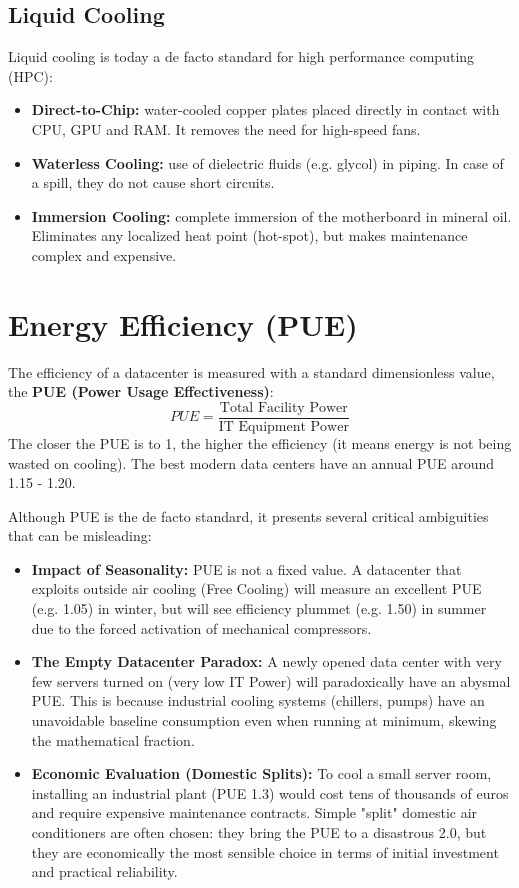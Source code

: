 \subsection{Liquid Cooling}
Liquid cooling is today a de facto standard for high performance computing (HPC):
\begin{itemize}
    \item \textbf{Direct-to-Chip:} water-cooled copper plates placed directly in contact with CPU, GPU and RAM. It removes the need for high-speed fans.
    \item \textbf{Waterless Cooling:} use of dielectric fluids (e.g. glycol) in piping. In case of a spill, they do not cause short circuits.
    \item \textbf{Immersion Cooling:} complete immersion of the motherboard in mineral oil. Eliminates any localized heat point (hot-spot), but makes maintenance complex and expensive.
\end{itemize}

\section{Energy Efficiency (PUE)}
The efficiency of a datacenter is measured with a standard dimensionless value, the \textbf{PUE (Power Usage Effectiveness)}:
\[
PUE = \frac{\text{Total Facility Power}}{\text{IT Equipment Power}}
\]
The closer the PUE is to 1, the higher the efficiency (it means energy is not being wasted on cooling). The best modern data centers have an annual PUE around 1.15 - 1.20.

\begin{warningbox}
Although PUE is the de facto standard, it presents several critical ambiguities that can be misleading:
\begin{itemize}
    \item \textbf{Impact of Seasonality:} PUE is not a fixed value. A datacenter that exploits outside air cooling (Free Cooling) will measure an excellent PUE (e.g. 1.05) in winter, but will see efficiency plummet (e.g. 1.50) in summer due to the forced activation of mechanical compressors.
    \item \textbf{The Empty Datacenter Paradox:} A newly opened data center with very few servers turned on (very low IT Power) will paradoxically have an abysmal PUE. This is because industrial cooling systems (chillers, pumps) have an unavoidable baseline consumption even when running at minimum, skewing the mathematical fraction.
    \item \textbf{Economic Evaluation (Domestic Splits):} To cool a small server room, installing an industrial plant (PUE 1.3) would cost tens of thousands of euros and require expensive maintenance contracts. Simple "split" domestic air conditioners are often chosen: they bring the PUE to a disastrous 2.0, but they are economically the most sensible choice in terms of initial investment and practical reliability.
\end{itemize}
\end{warningbox}


